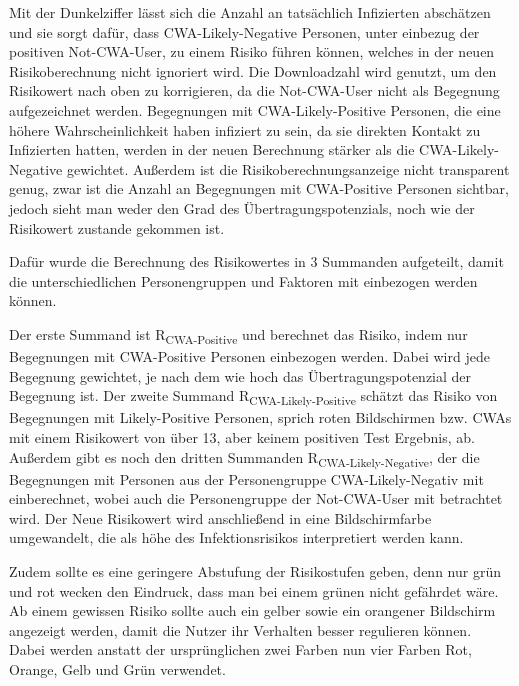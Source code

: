 \documentclass[conference]{IEEEtran}
\begin{document}
Mit der Dunkelziffer lässt sich die Anzahl an tatsächlich Infizierten abschätzen und sie sorgt dafür, dass CWA-Likely-Negative Personen, unter einbezug der positiven Not-CWA-User, 
zu einem Risiko führen können, welches in der neuen Risikoberechnung nicht ignoriert wird.
Die Downloadzahl wird genutzt, um den Risikowert nach oben zu korrigieren, da die Not-CWA-User nicht als Begegnung aufgezeichnet werden.
Begegnungen mit CWA-Likely-Positive Personen, die eine höhere Wahrscheinlichkeit haben infiziert zu sein, da sie direkten Kontakt zu Infizierten hatten, 
werden in der neuen Berechnung stärker als die CWA-Likely-Negative gewichtet.
Außerdem ist die Risikoberechnungsanzeige nicht transparent genug, zwar ist die Anzahl an Begegnungen mit CWA-Positive Personen sichtbar, 
jedoch sieht man weder den Grad des Übertragungspotenzials, noch wie der Risikowert zustande gekommen ist.

Dafür wurde die Berechnung des Risikowertes in 3 Summanden aufgeteilt, damit die unterschiedlichen Personengruppen und Faktoren mit einbezogen werden können.

\centerline{\text{ }}
\centerline{}
\centerline{}
\centerline{\text{ }}

Der erste Summand ist R\textsubscript{CWA-Positive} und berechnet das Risiko, indem nur Begegnungen mit CWA-Positive Personen einbezogen werden. 
Dabei wird jede Begegnung gewichtet, je nach dem wie hoch das Übertragungspotenzial der Begegnung ist. 
Der zweite Summand R\textsubscript{CWA-Likely-Positive} schätzt das Risiko von Begegnungen mit Likely-Positive Personen, sprich roten Bildschirmen bzw. 
CWAs mit einem Risikowert von über 13, aber keinem positiven Test Ergebnis, ab.
Außerdem gibt es noch den dritten Summanden R\textsubscript{CWA-Likely-Negative}, der die Begegnungen mit Personen aus der Personengruppe CWA-Likely-Negativ mit einberechnet,
wobei auch die Personengruppe der Not-CWA-User mit betrachtet wird.
Der Neue Risikowert wird anschließend in eine Bildschirmfarbe umgewandelt, die als höhe des Infektionsrisikos interpretiert werden kann.

Zudem sollte es eine geringere Abstufung der Risikostufen geben, denn nur grün und rot wecken den Eindruck, dass man bei einem grünen nicht gefährdet wäre. 
Ab einem gewissen Risiko sollte auch ein gelber sowie ein orangener Bildschirm angezeigt werden, damit die Nutzer ihr Verhalten besser regulieren können. \\
Dabei werden anstatt der ursprünglichen zwei Farben nun vier Farben Rot, Orange, Gelb und Grün verwendet.
\\
\end{document}

